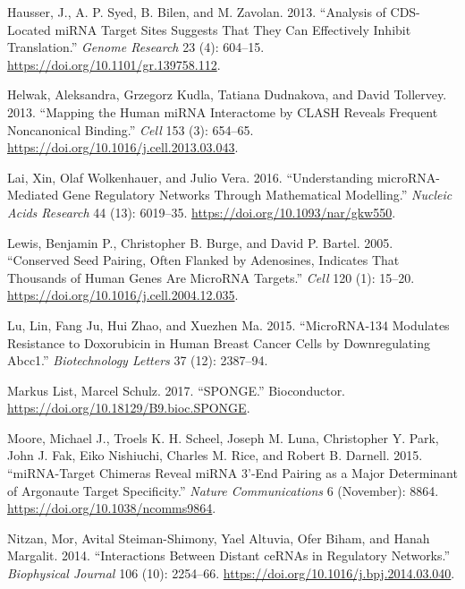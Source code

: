 \documentclass[]{article}
\begin{document}
\leavevmode\hypertarget{ref-hausser_analysis_2013}{}%
Hausser, J., A. P. Syed, B. Bilen, and M. Zavolan. 2013. ``Analysis of
CDS-Located miRNA Target Sites Suggests That They Can Effectively
Inhibit Translation.'' \emph{Genome Research} 23 (4): 604--15.
\url{https://doi.org/10.1101/gr.139758.112}.

\leavevmode\hypertarget{ref-helwak_mapping_2013}{}%
Helwak, Aleksandra, Grzegorz Kudla, Tatiana Dudnakova, and David
Tollervey. 2013. ``Mapping the Human miRNA Interactome by CLASH Reveals
Frequent Noncanonical Binding.'' \emph{Cell} 153 (3): 654--65.
\url{https://doi.org/10.1016/j.cell.2013.03.043}.

\leavevmode\hypertarget{ref-lai_understanding_2016}{}%
Lai, Xin, Olaf Wolkenhauer, and Julio Vera. 2016. ``Understanding
microRNA-Mediated Gene Regulatory Networks Through Mathematical
Modelling.'' \emph{Nucleic Acids Research} 44 (13): 6019--35.
\url{https://doi.org/10.1093/nar/gkw550}.

\leavevmode\hypertarget{ref-lewis_conserved_2005}{}%
Lewis, Benjamin P., Christopher B. Burge, and David P. Bartel. 2005.
``Conserved Seed Pairing, Often Flanked by Adenosines, Indicates That
Thousands of Human Genes Are MicroRNA Targets.'' \emph{Cell} 120 (1):
15--20. \url{https://doi.org/10.1016/j.cell.2004.12.035}.

\leavevmode\hypertarget{ref-lu2015microrna}{}%
Lu, Lin, Fang Ju, Hui Zhao, and Xuezhen Ma. 2015. ``MicroRNA-134
Modulates Resistance to Doxorubicin in Human Breast Cancer Cells by
Downregulating Abcc1.'' \emph{Biotechnology Letters} 37 (12): 2387--94.

\leavevmode\hypertarget{ref-markus_list_sponge_2017}{}%
Markus List, Marcel Schulz. 2017. ``SPONGE.'' Bioconductor.
\url{https://doi.org/10.18129/B9.bioc.SPONGE}.

\leavevmode\hypertarget{ref-moore_mirnatarget_2015}{}%
Moore, Michael J., Troels K. H. Scheel, Joseph M. Luna, Christopher Y.
Park, John J. Fak, Eiko Nishiuchi, Charles M. Rice, and Robert B.
Darnell. 2015. ``miRNA-Target Chimeras Reveal miRNA 3'-End Pairing as a
Major Determinant of Argonaute Target Specificity.'' \emph{Nature
Communications} 6 (November): 8864.
\url{https://doi.org/10.1038/ncomms9864}.

\leavevmode\hypertarget{ref-nitzan_interactions_2014}{}%
Nitzan, Mor, Avital Steiman-Shimony, Yael Altuvia, Ofer Biham, and Hanah
Margalit. 2014. ``Interactions Between Distant ceRNAs in Regulatory
Networks.'' \emph{Biophysical Journal} 106 (10): 2254--66.
\url{https://doi.org/10.1016/j.bpj.2014.03.040}.
\end{document}
